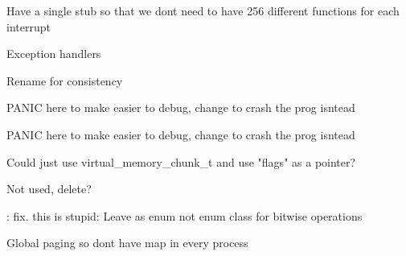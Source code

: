 \begin{DoxyRefList}
Have a single stub so that we don\textquotesingle{}t need to have 256 different functions for each interrupt  
\item[Member \doxylink{classMaxOS_1_1hardwarecommunication_1_1InterruptManager_aef7732df6b028702cec9ec722e80ee92}{Max\+OS\+::hardwarecommunication\+::Interrupt\+Manager\+::Handle\+Interrupt} (\doxylink{cpu_8h_a605489186b2c614af947b15ae8a77418}{system\+::cpu\+\_\+status\+\_\+t} \texorpdfstring{$\ast$}{*}status)]\label{todo__todo000027}%
%
Exception handlers  
\item[Member \doxylink{apic_8h_a13e29373273b62f2498bced57f5e465d}{Max\+OS\+::hardwarecommunication\+::madt\+\_\+io\+\_\+apic\+\_\+t} ]\label{todo__todo000005}%
%
Rename for consistency  
\item[Member \doxylink{structMaxOS_1_1memory_1_1allocator_1_1ChunkHeader_adf0e65e5dce3778e192f52551ef59dfd}{Max\+OS\+::memory\+::allocator\+::Chunk\+Header\+::next\+\_\+chunk} ()]\label{todo__todo000031}%
%
PANIC here to make easier to debug, change to crash the prog isntead  
\item[Member \doxylink{structMaxOS_1_1memory_1_1allocator_1_1ChunkHeader_af1ee0c5737f40b3090497bb5b1cb3a0f}{Max\+OS\+::memory\+::allocator\+::Chunk\+Header\+::prev\+\_\+chunk} ()]\label{todo__todo000030}%
%
PANIC here to make easier to debug, change to crash the prog isntead  
\item[Member \doxylink{virtual_8h_a1784dc53ca0b9a38fa243ee638fab7d4}{Max\+OS\+::memory\+::free\+\_\+chunk\+\_\+t} ]\label{todo__todo000015}%
%
Could just use virtual\+\_\+memory\+\_\+chunk\+\_\+t and use "{}flags"{} as a pointer?  
\item[Class \doxylink{classMaxOS_1_1memory_1_1MemIO}{Max\+OS\+::memory\+::Mem\+IO} ]\label{todo__todo000011}%
%
Not used, delete?  
\item[Member \doxylink{physical_8h_aa3df811efd0bcc8e3652661e1ee92c60}{Max\+OS\+::memory\+::page\+\_\+flags\+\_\+t} ]\label{todo__todo000012}%
%
\+: fix. this is stupid\+: Leave as enum not enum class for bitwise operations  
\item[Class \doxylink{classMaxOS_1_1memory_1_1PhysicalMemoryManager}{Max\+OS\+::memory\+::Physical\+Memory\+Manager} ]\label{todo__todo000013}%
%
Global paging so dont have map in every process  
\item[Member \doxylink{classMaxOS_1_1memory_1_1PhysicalMemoryManager_af68e198da5c85cc1443f28ecd0f92bd2}{Max\+OS\+::memory\+::Physical\+Memory\+Manager\+::allocate\+\_\+area} (uint64\+\_\+t start\+\_\+address, size\+\_\+t size)]\label{todo__todo000032}%

\end{DoxyRefList}
